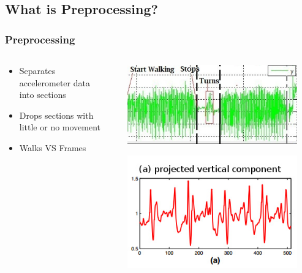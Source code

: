 \documentclass{beamer}
\begin{document}
\subsection{What is Preprocessing?}
\begin{frame}
  \frametitle{Preprocessing}

  \begin{columns}
  \begin{column}{0.5\textwidth}
  \begin{itemize}
    \item Separates accelerometer data into sections
    \linebreak
    \item Drops sections with little or no movement
    \linebreak
    \item Walks VS Frames
  \end{itemize}
  \end{column}

\begin{column}{0.02\textwidth}
\end{column}

\begin{column}{0.5\textwidth}

\includegraphics[width=0.91\textwidth]{Illustrations/preprocessingexample.png}

\includegraphics[width=0.91\textwidth]{Illustrations/frame.jpg}

\end{column}  
  
  
  \end{columns}
\end{frame}
\end{document}
